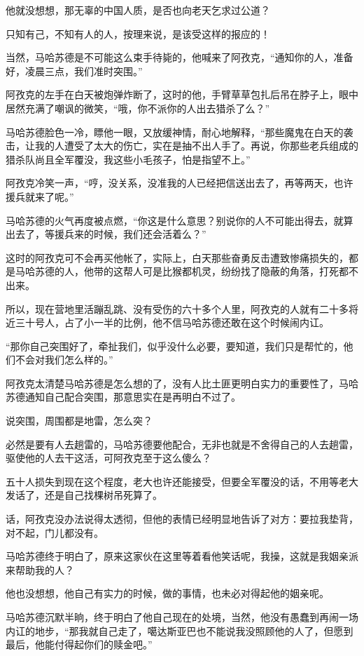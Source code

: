 他就没想想，那无辜的中国人质，是否也向老天乞求过公道？

只知有己，不知有人的人，按理来说，是该受这样的报应的！

当然，马哈苏德是不可能这么束手待毙的，他喊来了阿孜克，“通知你的人，准备好，凌晨三点，我们准时突围。”

阿孜克的左手在白天被炮弹炸断了，这时的他，手臂草草包扎后吊在脖子上，眼中居然充满了嘲讽的微笑，“哦，你不派你的人出去猎杀了么？”

马哈苏德脸色一冷，瞟他一眼，又放缓神情，耐心地解释，“那些魔鬼在白天的袭击，让我的人遭受了太大的伤亡，实在是抽不出人手了。再说，你那些老兵组成的猎杀队尚且全军覆没，我这些小毛孩子，怕是指望不上。”

阿孜克冷笑一声，“哼，没关系，没准我的人已经把信送出去了，再等两天，也许援兵就来了呢。”

马哈苏德的火气再度被点燃，“你这是什么意思？别说你的人不可能出得去，就算出去了，等援兵来的时候，我们还会活着么？”

这时的阿孜克可不会再买他帐了，实际上，白天那些奋勇反击遭致惨痛损失的，都是马哈苏德的人，他带的这帮人可是比猴都机灵，纷纷找了隐蔽的角落，打死都不出来。

所以，现在营地里活蹦乱跳、没有受伤的六十多个人里，阿孜克的人就有二十多将近三十号人，占了小一半的比例，他不信马哈苏德还敢在这个时候闹内讧。

“那你自己突围好了，牵扯我们，似乎没什么必要，要知道，我们只是帮忙的，他们不会对我们怎么样的。”

阿孜克太清楚马哈苏德是怎么想的了，没有人比土匪更明白实力的重要性了，马哈苏德通知自己配合突围，那意思实在是再明白不过了。

说突围，周围都是地雷，怎么突？

必然是要有人去趟雷的，马哈苏德要他配合，无非也就是不舍得自己的人去趟雷，驱使他的人去干这活，可阿孜克至于这么傻么？

五十人损失到现在这个程度，老大也许还能接受，但要全军覆没的话，不用等老大发话了，还是自己找棵树吊死算了。

话，阿孜克没办法说得太透彻，但他的表情已经明显地告诉了对方：要拉我垫背，对不起，门儿都没有。

马哈苏德终于明白了，原来这家伙在这里等着看他笑话呢，我操，这就是我姻亲派来帮助我的人？

他也没想想，他自己有实力的时候，做的事情，也未必对得起他的姻亲呢。

马哈苏德沉默半晌，终于明白了他自己现在的处境，当然，他没有愚蠢到再闹一场内讧的地步，“那我就自己走了，噶达斯亚巴也不能说我没照顾他的人了，但愿到最后，他能付得起你们的赎金吧。”

